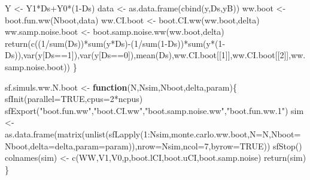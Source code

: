 \documentclass[
]{book}
\newenvironment{Shaded}{\begin{snugshade}}{\end{snugshade}}
\newcommand{\AttributeTok}[1]{\textcolor[rgb]{0.77,0.63,0.00}{#1}}
\newcommand{\ConstantTok}[1]{\textcolor[rgb]{0.00,0.00,0.00}{#1}}
\newcommand{\ControlFlowTok}[1]{\textcolor[rgb]{0.13,0.29,0.53}{\textbf{#1}}}
\newcommand{\DecValTok}[1]{\textcolor[rgb]{0.00,0.00,0.81}{#1}}
\newcommand{\FunctionTok}[1]{\textcolor[rgb]{0.00,0.00,0.00}{#1}}
\newcommand{\NormalTok}[1]{#1}
\newcommand{\OtherTok}[1]{\textcolor[rgb]{0.56,0.35,0.01}{#1}}
\newcommand{\SpecialCharTok}[1]{\textcolor[rgb]{0.00,0.00,0.00}{#1}}
\newcommand{\StringTok}[1]{\textcolor[rgb]{0.31,0.60,0.02}{#1}}
\theoremstyle{definition}
\theoremstyle{definition}
\theoremstyle{definition}
\theoremstyle{definition}
\theoremstyle{remark}
\begin{document}
\begin{Shaded}
\begin{Highlighting}[]
\NormalTok{  Y }\OtherTok{\textless{}{-}}\NormalTok{ Y1}\SpecialCharTok{*}\NormalTok{Ds}\SpecialCharTok{+}\NormalTok{Y0}\SpecialCharTok{*}\NormalTok{(}\DecValTok{1}\SpecialCharTok{{-}}\NormalTok{Ds)}
\NormalTok{  data }\OtherTok{\textless{}{-}} \FunctionTok{as.data.frame}\NormalTok{(}\FunctionTok{cbind}\NormalTok{(y,Ds,yB))}
\NormalTok{  ww.boot }\OtherTok{\textless{}{-}} \FunctionTok{boot.fun.ww}\NormalTok{(Nboot,data)}
\NormalTok{  ww.CI.boot }\OtherTok{\textless{}{-}} \FunctionTok{boot.CI.ww}\NormalTok{(ww.boot,delta)}
\NormalTok{  ww.samp.noise.boot }\OtherTok{\textless{}{-}} \FunctionTok{boot.samp.noise.ww}\NormalTok{(ww.boot,delta)}
  \FunctionTok{return}\NormalTok{(}\FunctionTok{c}\NormalTok{((}\DecValTok{1}\SpecialCharTok{/}\FunctionTok{sum}\NormalTok{(Ds))}\SpecialCharTok{*}\FunctionTok{sum}\NormalTok{(y}\SpecialCharTok{*}\NormalTok{Ds)}\SpecialCharTok{{-}}\NormalTok{(}\DecValTok{1}\SpecialCharTok{/}\FunctionTok{sum}\NormalTok{(}\DecValTok{1}\SpecialCharTok{{-}}\NormalTok{Ds))}\SpecialCharTok{*}\FunctionTok{sum}\NormalTok{(y}\SpecialCharTok{*}\NormalTok{(}\DecValTok{1}\SpecialCharTok{{-}}\NormalTok{Ds)),}\FunctionTok{var}\NormalTok{(y[Ds}\SpecialCharTok{==}\DecValTok{1}\NormalTok{]),}\FunctionTok{var}\NormalTok{(y[Ds}\SpecialCharTok{==}\DecValTok{0}\NormalTok{]),}\FunctionTok{mean}\NormalTok{(Ds),ww.CI.boot[[}\DecValTok{1}\NormalTok{]],ww.CI.boot[[}\DecValTok{2}\NormalTok{]],ww.samp.noise.boot))}
\NormalTok{\}}

\NormalTok{sf.simuls.ww.N.boot }\OtherTok{\textless{}{-}} \ControlFlowTok{function}\NormalTok{(N,Nsim,Nboot,delta,param)\{}
  \FunctionTok{sfInit}\NormalTok{(}\AttributeTok{parallel=}\ConstantTok{TRUE}\NormalTok{,}\AttributeTok{cpus=}\DecValTok{2}\SpecialCharTok{*}\NormalTok{ncpus)}
  \FunctionTok{sfExport}\NormalTok{(}\StringTok{"boot.fun.ww"}\NormalTok{,}\StringTok{"boot.CI.ww"}\NormalTok{,}\StringTok{"boot.samp.noise.ww"}\NormalTok{,}\StringTok{"boot.fun.ww.1"}\NormalTok{)}
\NormalTok{  sim }\OtherTok{\textless{}{-}} \FunctionTok{as.data.frame}\NormalTok{(}\FunctionTok{matrix}\NormalTok{(}\FunctionTok{unlist}\NormalTok{(}\FunctionTok{sfLapply}\NormalTok{(}\DecValTok{1}\SpecialCharTok{:}\NormalTok{Nsim,monte.carlo.ww.boot,}\AttributeTok{N=}\NormalTok{N,}\AttributeTok{Nboot=}\NormalTok{Nboot,}\AttributeTok{delta=}\NormalTok{delta,}\AttributeTok{param=}\NormalTok{param)),}\AttributeTok{nrow=}\NormalTok{Nsim,}\AttributeTok{ncol=}\DecValTok{7}\NormalTok{,}\AttributeTok{byrow=}\ConstantTok{TRUE}\NormalTok{))}
  \FunctionTok{sfStop}\NormalTok{()}
  \FunctionTok{colnames}\NormalTok{(sim) }\OtherTok{\textless{}{-}} \FunctionTok{c}\NormalTok{(}\StringTok{\textquotesingle{}WW\textquotesingle{}}\NormalTok{,}\StringTok{\textquotesingle{}V1\textquotesingle{}}\NormalTok{,}\StringTok{\textquotesingle{}V0\textquotesingle{}}\NormalTok{,}\StringTok{\textquotesingle{}p\textquotesingle{}}\NormalTok{,}\StringTok{\textquotesingle{}boot.lCI\textquotesingle{}}\NormalTok{,}\StringTok{\textquotesingle{}boot.uCI\textquotesingle{}}\NormalTok{,}\StringTok{\textquotesingle{}boot.samp.noise\textquotesingle{}}\NormalTok{)}
  \FunctionTok{return}\NormalTok{(sim)}
\NormalTok{\}}


\end{Highlighting}
\end{Shaded}
\end{document}
